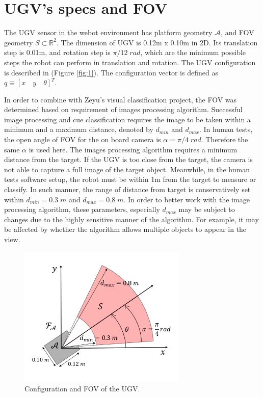 \documentclass[12pt,draftcls,onecolumn]{IEEEtran}
\begin{document}
\section{UGV's specs and FOV} 


The UGV sensor in the webot environment has platform geometry $\mathcal{A}$, and FOV geometry $S \subset \mathbb{R}^2 $. 
The dimension of UGV is 0.12m x 0.10m in 2D.
Its translation step is 0.01m, and rotation step is $\pi/12 \; rad$, which are the minimum possible steps the robot can perform in translation and rotation. 
The UGV configuration is described in  (Figure \ref{fig:1}).
The configuration vector is defined as $q \equiv [x  \quad  y  \quad  \theta]^T$.



In order to combine with Zeyu's visual classification project, the FOV was determined based on requirement of  images processing algorithm. 
Successful image processing and cue classification requires the image to be taken within a minimum and a maximum distance, denoted by $d_{min}$ and  $d_{max}$. 
In human tests, the open angle of FOV for the on board camera is $\alpha =\pi/4  \;rad $. 
Therefore the same  $\alpha$ is used here.
The  images processing algorithm requires a minimum distance from the target.
If the UGV is too close from the target, the camera is not able to capture a full image of the target object. 
Meanwhile, in the human tests software setup, the robot must be within 1m from the target to  measure or classify.
In such manner, the range of distance from target is conservatively set within $d_{min} = 0.3 \;m$ and  $d_{max}=0.8\; m$.
In order to better work with the image processing algorithm, these parameters, especially $d_{max}$ may be subject to changes due to the highly sensitive manner of the algorithm. 
For example, it may be affected by whether the algorithm allows multiple objects to appear in the view. 

\begin{figure}
 \centering
  \includegraphics[width=8cm]{figures/FOV}
  \caption{Configuration and FOV of the UGV.}
  \label{fig:3}
\end{figure}
\end{document}
